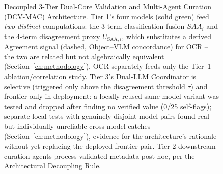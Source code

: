 \documentclass[12pt,a4paper]{report}
\begin{document}
\begin{figure}[!htbp]
{%
}
\caption[Decoupled 3-Tier Dual-Core Validation and Multi-Agent Curation (DCV-MAC) Architecture]{Decoupled 3-Tier Dual-Core Validation and Multi-Agent Curation (DCV-MAC) Architecture. Tier 1's four models (solid green) feed \emph{two distinct} computations: the 3-term classification fusion $SAA_i$ and the 4-term disagreement proxy $U_{\text{SAA},i}$, which substitutes a derived Agreement signal (dashed, Object--VLM concordance) for OCR -- the two are related but not algebraically equivalent (Section~\ref{ch:methodology}). OCR separately feeds only the Tier~1 ablation/correlation study. Tier 3's Dual-LLM Coordinator is selective (triggered only above the disagreement threshold $\tau$) and frontier-only in deployment: a locally-reused same-model variant was tested and dropped after finding no verified value (0/25 self-flags); separate local tests with genuinely disjoint model pairs found real but individually-unreliable cross-model catches (Section~\ref{ch:methodology}), evidence for the architecture's rationale without yet replacing the deployed frontier pair. Tier 2 downstream curation agents process validated metadata post-hoc, per the Architectural Decoupling Rule.}
\label{fig:full_pipeline_flow}
\end{figure}
\end{document}
